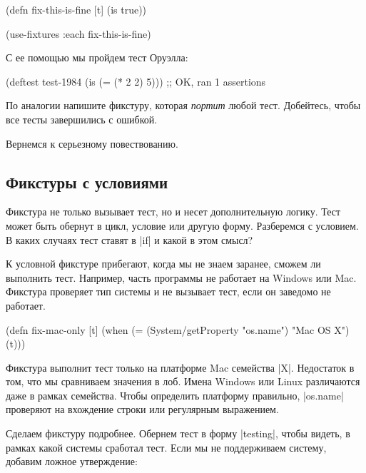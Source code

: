 \begin{english}
  \begin{clojure}
(defn fix-this-is-fine [t]
  (is true))

(use-fixtures :each fix-this-is-fine)
  \end{clojure}
\end{english}

С ее помощью мы пройдем тест Оруэлла:

\begin{english}
  \begin{clojure}
(deftest test-1984
  (is (= (* 2 2) 5)))
;; OK, ran 1 assertions
  \end{clojure}
\end{english}

По аналогии напишите фикстуру, которая \emph{портит} любой тест. Добейтесь,
чтобы все тесты завершились с ошибкой.

Вернемся к серьезному повествованию.

\subsection{Фикстуры с условиями}

Фикстура не только вызывает тест, но и несет дополнительную логику. Тест может
быть обернут в цикл, условие или другую форму. Разберемся с условием. В каких
случаях тест ставят в \spverb|if| и какой в этом смысл?

К условной фикстуре прибегают, когда мы не знаем заранее, сможем ли выполнить
тест. Например, часть программы не работает на Windows или Mac. Фикстура
проверяет тип системы и не вызывает тест, если он заведомо не работает.

\begin{english}
  \begin{clojure}
(defn fix-mac-only [t]
  (when (= (System/getProperty "os.name") "Mac OS X")
    (t)))
  \end{clojure}
\end{english}

Фикстура выполнит тест только на платформе Mac семейства \spverb|X|. Недостаток
в том, что мы сравниваем значения в лоб. Имена Windows или Linux различаются
даже в рамках семейства. Чтобы определить платформу правильно, \spverb|os.name|
проверяют на вхождение строки или регулярным выражением.

Сделаем фикстуру подробнее. Обернем тест в форму \spverb|testing|, чтобы видеть,
в рамках какой системы сработал тест. Если мы не поддерживаем систему, добавим
ложное утверждение:

